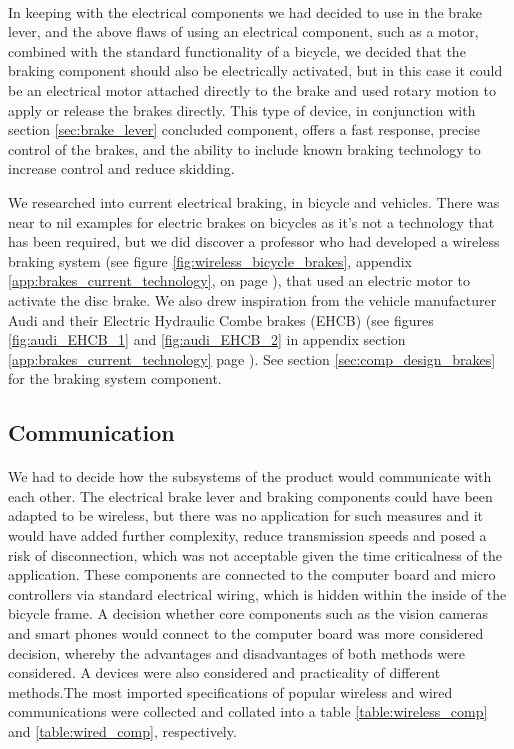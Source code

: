 \documentclass[a4paper]{report}
\begin{document}
{\paragraph{}In keeping with the electrical components we had decided to use in the brake lever, and the above flaws of using an electrical component, such as a motor, combined with the standard functionality of a bicycle, we decided that the braking component should also be electrically activated, but in this case it could be an electrical motor attached directly to the brake and used rotary motion to apply or release the brakes directly. This type of device, in conjunction with section \ref{sec:brake_lever} concluded component, offers a fast response, precise control of the brakes, and the ability to include known braking technology to increase control and reduce skidding.

We researched into current electrical braking, in bicycle and vehicles. There was near to nil examples for electric brakes on bicycles as it's not a technology that has been required, but we did discover a professor \cite{wireless_bicycle_brakes} who had developed a wireless braking system (see figure \ref{fig:wireless_bicycle_brakes}, appendix \ref{app:brakes_current_technology}, on page \pageref{fig:wireless_bicycle_brakes}), that used an electric motor to activate the disc brake. We also drew inspiration from the vehicle manufacturer Audi and their Electric Hydraulic Combe brakes (EHCB) (see figures \ref{fig:audi_EHCB_1} and \ref{fig:audi_EHCB_2} in appendix section \ref{app:brakes_current_technology} page \pageref{app:brakes_current_technology}). See section \ref{sec:comp_design_brakes} for the braking system component.


\subsection{Communication}
\paragraph{}We had to decide how the subsystems of the product would communicate with each other. The electrical brake lever and braking components could have been adapted to be wireless, but there was no application for such measures and it would have added further complexity, reduce transmission speeds and posed a risk of disconnection, which was not acceptable given the time criticalness of the application. These components are connected to the computer board and micro controllers via standard electrical wiring, which is hidden within the inside of the bicycle frame. A decision whether core components such as the vision cameras and smart phones would connect to the computer board was more considered decision, whereby the advantages and disadvantages of both methods were considered. A devices were also considered and practicality of different methods.The most imported specifications of popular wireless and wired communications were collected and collated into a table \ref{table:wireless_comp} and \ref{table:wired_comp}, respectively.

}
\end{document}
